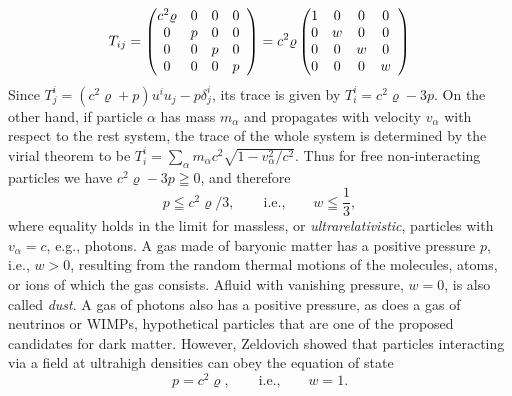 \begin{equation}
	T_{ij}
	=
	\left(\begin{array}{@{}cccc}
	  c^2\varrho  &  0  &  0  &  0 \\
		0   &  p  &  0  &  0 \\
		0   &  0  &  p  &  0 \\
		0   &  0  &  0  &  p \\
	\end{array}\right)
	= 
	c^2\varrho
	\left(\begin{array}{@{}cccc}
		1  &  0  &  0  &  0 \\
		0   &  w  &  0  &  0 \\
		0   &  0  &  w  &  0 \\
		0   &  0  &  0  &  w \\
	\end{array}\right)
	\label{eq:fluid-energy-momentum-tensor-in-rest-system}
\end{equation}
Since $T^i_j = (c^2 \varrho + p) u^i u_j - p \delta^i_j$, its trace is given by
$ %
	T^{i}_{i}
	= c^2\varrho - 3 p
	.
$ %
On the other hand, if particle $\alpha$ has mass $m_\alpha$ and propagates with velocity $v_\alpha$ with respect to the rest system, the trace of the whole system is determined by the virial theorem to be 
$
	T^i_i 
	= \sum_{\alpha} m_\alpha c^2 \sqrt{1 - v_\alpha^2 / c^2}
	.
$
\cite[104]{Landau-Lifschitz-1997}
Thus for free non-interacting particles we have $c^2\varrho - 3 p \geqq 0$, and therefore
\begin{equation}
	p \leqq c^2\varrho / 3
	,
	\qquad \mbox{i.e.,} \qquad
	w \leqq \frac{1}{3}
	,
	\label{eq:FLRW-p-vs-rho}
\end{equation}
where equality holds in the limit for massless, or \emph{ultrarelativistic}, particles with $v_\alpha = c$, e.g., photons. A gas made of baryonic matter has a positive pressure $p$, i.e., $w>0$, resulting from the random thermal motions of the molecules, atoms, or ions of which the gas consists. Afluid with vanishing pressure, $w=0$, is also called \emph{dust}. A gas of photons also has a positive pressure, as does a gas of neutrinos or WIMPs, hypothetical particles that are one of the proposed candidates for dark matter. \cite[60]{Ryden-2017}
However, Zeldovich \cite{Zeldovich-1962} showed that particles interacting via a field at ultrahigh densities can obey the equation of state
\begin{equation}
	p = c^2 \varrho,
	\qquad
	\mbox{i.e.,} \qquad
	w = 1
	.
\end{equation}
